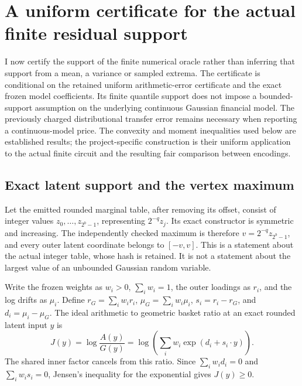 \section{A uniform certificate for the actual finite residual support}
\label{sec:finite-range}

I now certify the support of the finite numerical oracle rather than
inferring that support from a mean, a variance or sampled extrema. The
certificate is conditional on the retained uniform arithmetic-error
certificate and the exact frozen model coefficients. Its finite quantile
support does not impose a bounded-support assumption on the underlying
continuous Gaussian financial model. The previously charged distributional
transfer error remains necessary when reporting a continuous-model price.
The convexity and moment inequalities used below are established results;
the project-specific construction is their uniform application to the
actual finite circuit and the resulting fair comparison between encodings.

\subsection{Exact latent support and the vertex maximum}

Let the emitted rounded marginal table, after removing its offset, consist
of integer values \(z_0,\ldots,z_{2^b-1}\), representing
\(2^{-q}z_j\). Its exact constructor is symmetric and increasing.
The independently checked maximum is therefore
\(v=2^{-q}z_{2^b-1}\), and every outer latent coordinate belongs to
\([-v,v]\). This is a statement about the actual integer table, whose
hash is retained. It is not a statement about the largest value of an
unbounded Gaussian random variable.

Write the frozen weights as \(w_i>0\), \(\sum_iw_i=1\), the outer
loadings as \(r_i\), and the log drifts as \(\mu_i\). Define
\(r_G=\sum_iw_i r_i\), \(\mu_G=\sum_iw_i\mu_i\),
\(s_i=r_i-r_G\), and \(d_i=\mu_i-\mu_G\). The ideal arithmetic to
geometric basket ratio at an exact rounded latent input \(y\) is
\[
 J(y)=\log\frac{A(y)}{G(y)}
     =\log\left(\sum_i w_i\exp(d_i+s_i\cdot y)\right).
                                                               \tag{R1}
\]
The shared inner factor cancels from this ratio. Since
\(\sum_iw_i d_i=0\) and \(\sum_iw_i s_i=0\), Jensen's inequality
for the exponential gives \(J(y)\geq0\).

